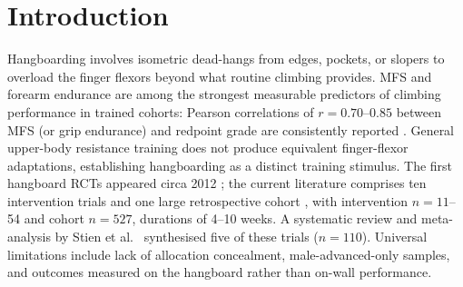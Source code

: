 \section{Introduction}

Hangboarding involves isometric dead-hangs from edges, pockets, or slopers to overload the finger flexors beyond what routine climbing provides. MFS and forearm endurance are among the strongest measurable predictors of climbing performance in trained cohorts: Pearson correlations of $r = 0.70$--$0.85$ between MFS (or grip endurance) and redpoint grade are consistently reported \cite{WAT04, MSBE07, FSSE16}. General upper-body resistance training does not produce equivalent finger-flexor adaptations, establishing hangboarding as a distinct training stimulus. The first hangboard RCTs appeared circa 2012 \cite{O12, MO15}; the current literature comprises ten intervention trials and one large retrospective cohort \cite{O12, MO15, O19, LEV19, MSAE21, DO22, HO22, DO24, LAS24, O25, GKAO24}, with intervention $n = 11$--54 and cohort $n = 527$, durations of 4--10 weeks. A systematic review and meta-analysis by Stien et al.\ \cite{SO23} synthesised five of these trials ($n = 110$). Universal limitations include lack of allocation concealment, male-advanced-only samples, and outcomes measured on the hangboard rather than on-wall performance.
